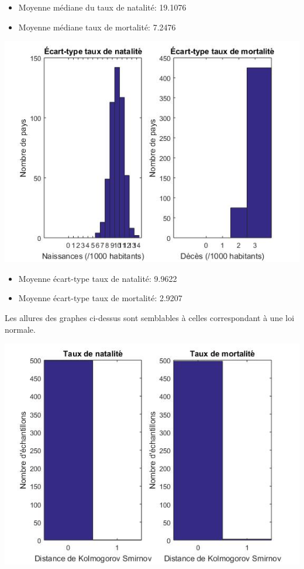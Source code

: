 \documentclass[a4paper,10pt]{article}
\begin{document}
\begin{itemize}
	\item Moyenne médiane du taux de natalité: 19.1076
	\item Moyenne médiane taux de mortalité: 7.2476
\end{itemize}


\begin{center}
	\includegraphics[scale=0.8]{Figure11.jpg}
\end{center}


\begin{itemize}
	\item Moyenne écart-type taux de natalité: 9.9622
	\item Moyenne écart-type taux de mortalité: 2.9207
\end{itemize}


Les allures des graphes ci-dessus sont semblables à celles correspondant à une loi normale.

 


\begin{center}
	\includegraphics[scale=0.8]{Figure12.jpg}
\end{center}
\end{document}
